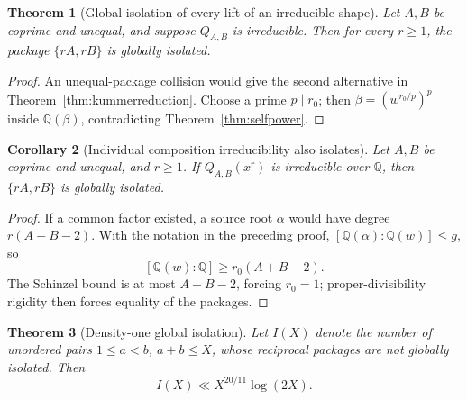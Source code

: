 \documentclass[11pt]{article}
\newtheorem{theorem}{Theorem}[section]
\newtheorem{corollary}[theorem]{Corollary}
\theoremstyle{definition}
\newcommand{\Q}{\mathbb Q}
\begin{document}
\begin{theorem}[Global isolation of every lift of an irreducible shape]
\label{thm:allliftsisolated}
Let \(A,B\) be coprime and unequal, and suppose \(Q_{A,B}\) is irreducible.
Then for every \(r\geq1\), the package \(\{rA,rB\}\) is globally isolated.
\end{theorem}

\begin{proof}
An unequal-package collision would give the second alternative in
Theorem~\ref{thm:kummerreduction}.  Choose a prime \(p\mid r_0\); then
\(\beta=(w^{r_0/p})^p\) inside \(\Q(\beta)\), contradicting
Theorem~\ref{thm:selfpower}.
\end{proof}

\begin{corollary}[Individual composition irreducibility also isolates]
\label{cor:individualirreducible}
Let \(A,B\) be coprime and unequal, and \(r\geq1\).  If
\(Q_{A,B}(x^r)\) is irreducible over \(\Q\), then \(\{rA,rB\}\) is
globally isolated.
\end{corollary}

\begin{proof}
If a common factor existed, a source root \(\alpha\) would have degree
\(r(A+B-2)\).  With the notation in the preceding proof,
\([\Q(\alpha):\Q(w)]\leq g\), so
\[
 [\Q(w):\Q]\geq r_0(A+B-2).
\]
The Schinzel bound is at most \(A+B-2\), forcing \(r_0=1\); proper-divisibility
rigidity then forces equality of the packages.
\end{proof}

\begin{theorem}[Density-one global isolation]
\label{thm:densityisolation}
Let \(I(X)\) denote the number of unordered pairs \(1\leq a<b\),
\(a+b\leq X\), whose reciprocal packages are not globally isolated.  Then
\begin{equation}
 I(X)\ll X^{20/11}\log(2X).
 \tag{14.10}
\end{equation}
\end{theorem}
\end{document}
